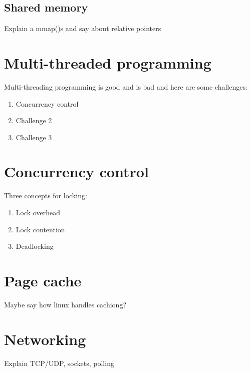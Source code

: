 \subsection{Shared memory}

Explain a mmap()s and say about relative pointers

\section{Multi-threaded programming}


Multi-threading programming is good and is bad and here are some challenges:

\begin{enumerate}
	\item Concurrency control
	\item Challenge 2
	\item Challenge 3
\end{enumerate}

\section{Concurrency control}


Three concepts for locking:

\begin{enumerate}
	\item Lock overhead
	\item Lock contention
	\item Deadlocking
\end{enumerate}

\section{Page cache}

Maybe say how linux handles cachiong?

\section{Networking}

Explain TCP/UDP, sockets, polling
